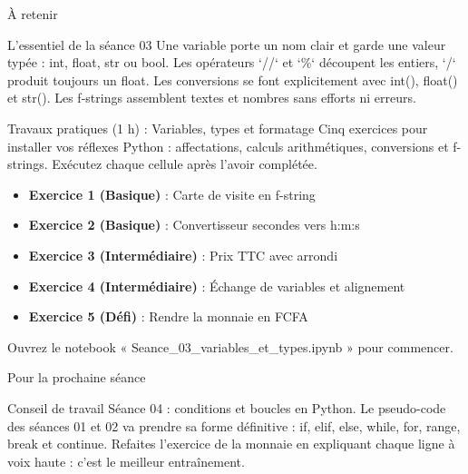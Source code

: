 \documentclass[aspectratio=169,11pt]{beamer}
\begin{document}
\begin{frame}{À retenir}
\begin{block}{L'essentiel de la séance 03}
Une variable porte un nom clair et garde une valeur typée : int, float, str ou bool. Les opérateurs `//` et `\%` découpent les entiers, `/` produit toujours un float. Les conversions se font explicitement avec int(), float() et str(). Les f-strings assemblent textes et nombres sans efforts ni erreurs.
\end{block}
\end{frame}

\begin{frame}{Travaux pratiques (1 h) : Variables, types et formatage}
Cinq exercices pour installer vos réflexes Python : affectations, calculs arithmétiques, conversions et f-strings. Exécutez chaque cellule après l'avoir complétée.

\begin{itemize}
  \setlength{\itemsep}{1.5pt}\setlength{\parskip}{0pt}
  \item \textbf{Exercice 1 (Basique)} : Carte de visite en f-string
  \item \textbf{Exercice 2 (Basique)} : Convertisseur secondes vers h:m:s
  \item \textbf{Exercice 3 (Intermédiaire)} : Prix TTC avec arrondi
  \item \textbf{Exercice 4 (Intermédiaire)} : Échange de variables et alignement
  \item \textbf{Exercice 5 (Défi)} : Rendre la monnaie en FCFA
\end{itemize}
\vspace{4pt}

{\small\color{PyGris}Ouvrez le notebook « Seance\_03\_variables\_et\_types.ipynb » pour commencer.}
\end{frame}
\begin{frame}{Pour la prochaine séance}
\begin{exampleblock}{Conseil de travail}
Séance 04 : conditions et boucles en Python. Le pseudo-code des séances 01 et 02 va prendre sa forme définitive : if, elif, else, while, for, range, break et continue. Refaites l'exercice de la monnaie en expliquant chaque ligne à voix haute : c'est le meilleur entraînement.
\end{exampleblock}
\end{frame}
\end{document}

